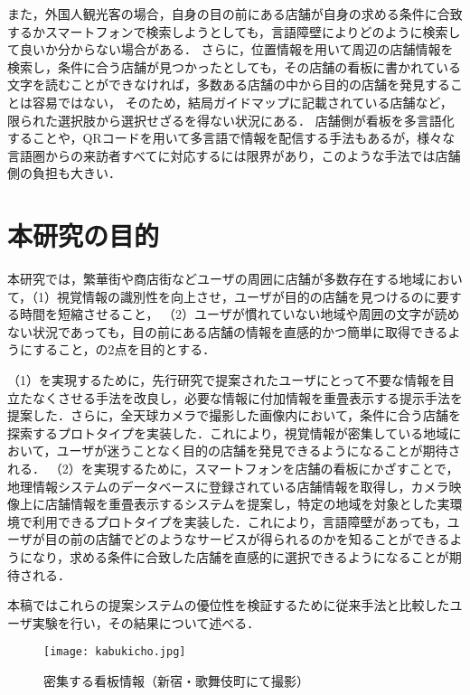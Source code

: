   また，外国人観光客の場合，自身の目の前にある店舗が自身の求める条件に合致するかスマートフォンで検索しようとしても，言語障壁によりどのように検索して良いか分からない場合がある．
  さらに，位置情報を用いて周辺の店舗情報を検索し，条件に合う店舗が見つかったとしても，その店舗の看板に書かれている文字を読むことができなければ，多数ある店舗の中から目的の店舗を発見することは容易ではない，
  そのため，結局ガイドマップに記載されている店舗など，限られた選択肢から選択せざるを得ない状況にある．
  店舗側が看板を多言語化することや，QRコードを用いて多言語で情報を配信する手法もあるが，様々な言語圏からの来訪者すべてに対応するには限界があり，このような手法では店舗側の負担も大きい．

\section{本研究の目的}
\label{section:purpose}
  本研究では，繁華街や商店街などユーザの周囲に店舗が多数存在する地域において，（1）視覚情報の識別性を向上させ，ユーザが目的の店舗を見つけるのに要する時間を短縮させること，
  （2）ユーザが慣れていない地域や周囲の文字が読めない状況であっても，目の前にある店舗の情報を直感的かつ簡単に取得できるようにすること，の2点を目的とする．

  （1）を実現するために，先行研究\cite{Fujita:2013}で提案されたユーザにとって不要な情報を目立たなくさせる手法を改良し，必要な情報に付加情報を重畳表示する提示手法を提案した．さらに，全天球カメラで撮影した画像内において，条件に合う店舗を探索するプロトタイプを実装した．これにより，視覚情報が密集している地域において，ユーザが迷うことなく目的の店舗を発見できるようになることが期待される．
  （2）を実現するために，スマートフォンを店舗の看板にかざすことで，地理情報システムのデータベースに登録されている店舗情報を取得し，カメラ映像上に店舗情報を重畳表示するシステムを提案し，特定の地域を対象とした実環境で利用できるプロトタイプを実装した．これにより，言語障壁があっても，ユーザが目の前の店舗でどのようなサービスが得られるのかを知ることができるようになり，求める条件に合致した店舗を直感的に選択できるようになることが期待される．

  本稿ではこれらの提案システムの優位性を検証するために従来手法と比較したユーザ実験を行い，その結果について述べる．

  \begin{figure}[tb]
    \centerline{\texttt{[image: kabukicho.jpg]}}
    \caption{密集する看板情報（新宿・歌舞伎町にて撮影）}
    \label{figure:kabukicho}
  \end{figure}
